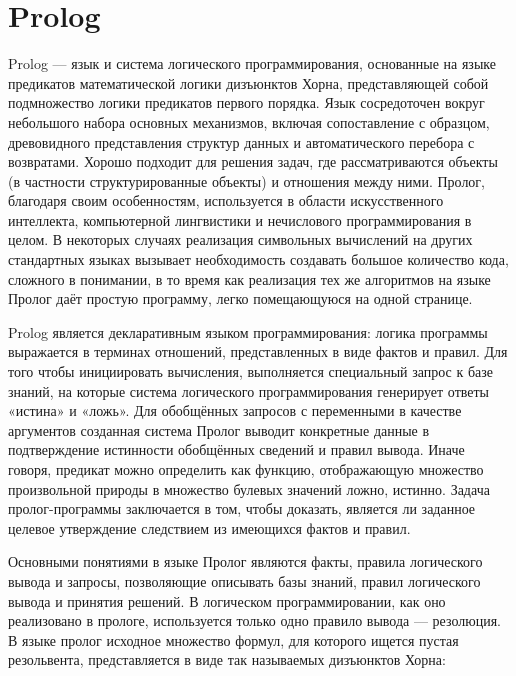 \section{Prolog}
\hspace{0.6cm}Prolog — язык и система логического программирования, основанные на языке предикатов математической логики дизъюнктов Хорна, представляющей собой подмножество логики предикатов первого порядка.
\hspace{0.6cm}Язык сосредоточен вокруг небольшого набора основных механизмов, включая сопоставление с образцом, древовидного представления структур данных и автоматического перебора с возвратами. Хорошо подходит для решения задач, где рассматриваются объекты (в частности структурированные объекты) и отношения между ними. Пролог, благодаря своим особенностям, используется в области искусственного интеллекта, компьютерной лингвистики и нечислового программирования в целом. В некоторых случаях реализация символьных вычислений на других стандартных языках вызывает необходимость создавать большое количество кода, сложного в понимании, в то время как реализация тех же алгоритмов на языке Пролог даёт простую программу, легко помещающуюся на одной странице.

\hspace{0.6cm}Prolog является декларативным языком программирования: логика программы выражается в терминах отношений, представленных в виде фактов и правил. Для того чтобы инициировать вычисления, выполняется специальный запрос к базе знаний, на которые система логического программирования генерирует ответы «истина» и «ложь». Для обобщённых запросов с переменными в качестве аргументов созданная система Пролог выводит конкретные данные в подтверждение истинности обобщённых сведений и правил вывода.
Иначе говоря, предикат можно определить как функцию, отображающую множество произвольной природы в множество булевых значений {ложно, истинно}. Задача пролог-программы заключается в том, чтобы доказать, является ли заданное целевое утверждение следствием из имеющихся фактов и правил.

\hspace{0.6cm}Основными понятиями в языке Пролог являются факты, правила логического вывода и запросы, позволяющие описывать базы знаний, правил логического вывода и принятия решений. В логическом программировании, как оно реализовано в прологе, используется только одно правило вывода — резолюция.
В языке пролог исходное множество формул, для которого ищется пустая резольвента, представляется в виде так называемых дизъюнктов Хорна:

